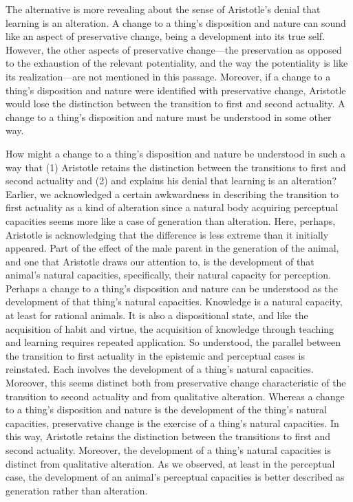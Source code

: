 The alternative is more revealing about the sense of Aristotle's denial that learning is an alteration. A change to a thing's disposition and nature can sound like an aspect of preservative change, being a development into its true self. However, the other aspects of preservative change---the preservation as opposed to the exhaustion of the relevant potentiality, and the way the potentiality is like its realization---are not mentioned in this passage. Moreover, if a change to a thing's disposition and nature were identified with preservative change, Aristotle would lose the distinction between the transition to first and second actuality. A change to a thing's disposition and nature must be understood in some other way.

How might a change to a thing's disposition and nature be understood in such a way that (1) Aristotle retains the distinction between the transitions to first and second actuality and (2) and explains his denial that learning is an alteration? Earlier, we acknowledged a certain awkwardness in describing the transition to first actuality as a kind of alteration since a natural body acquiring perceptual capacities seems more like a case of generation than alteration. Here, perhaps, Aristotle is acknowledging that the difference is less extreme than it initially appeared. Part of the effect of the male parent in the generation of the animal, and one that Aristotle draws our attention to, is the development of that animal's natural capacities, specifically, their natural capacity for perception. Perhaps a change to a thing's disposition and nature can be understood as the development of that thing's natural capacities. Knowledge is a natural capacity, at least for rational animals. It is also a dispositional state, and like the acquisition of habit and virtue, the acquisition of knowledge through teaching and learning requires repeated application. So understood, the parallel between the transition to first actuality in the epistemic and perceptual cases is reinstated. Each involves the development of a thing's natural capacities. Moreover, this seems distinct both from preservative change characteristic of the transition to second actuality and from qualitative alteration. Whereas a change to a thing's disposition and nature is the development of the thing's natural capacities, preservative change is the exercise of a thing's natural capacities. In this way, Aristotle retains the distinction between the transitions to first and second actuality. Moreover, the development of a thing's natural capacities is distinct from qualitative alteration. As we observed, at least in the perceptual case, the development of an animal's perceptual capacities is better described as generation rather than alteration.

